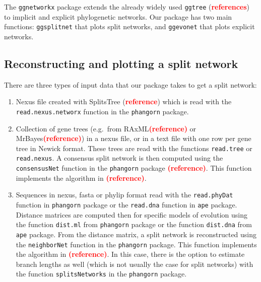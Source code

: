 \documentclass[]{IEEEtran}
\providecommand{\tightlist}{%
  \setlength{\itemsep}{0pt}\setlength{\parskip}{0pt}}
\begin{document}
The \texttt{ggnetworkx} package extends the already widely used \texttt{ggtree} (\textcolor{red}{\textbf{references}}) to implicit and explicit phylogenetic networks. Our package has two main functions: \texttt{ggsplitnet} that plots split networks, and \texttt{ggevonet} that plots explicit networks.

\vspace{-0.25cm}

\hypertarget{reconstructing-and-plotting-a-split-network}{%
\subsection{Reconstructing and plotting a split network}\label{reconstructing-and-plotting-a-split-network}}

There are three types of input data that our package takes to get a split network:

\begin{enumerate}
\def\labelenumi{\arabic{enumi}.}
\tightlist
\item
  Nexus file created with SplitsTree (\textcolor{red}{\textbf{reference}}) which is read with the \texttt{read.nexus.networx} function in the \texttt{phangorn} package.
\item
  Collection of gene trees (e.g.~from RAxML\textcolor{red}{\textbf{(reference)}} or MrBayes\textcolor{red}{\textbf{(reference)}}) in a nexus file, or in a text file with one row per gene tree in Newick format. These trees are read with the functions \texttt{read.tree} or \texttt{read.nexus}. A consensus split network is then computed using the \texttt{consensusNet} function in the \texttt{phangorn} package \textcolor{red}{\textbf{(reference)}}. This function implements the algorithm in \textcolor{red}{\textbf{(reference)}}.
\item
  Sequences in nexus, fasta or phylip format read with the \texttt{read.phyDat} function in \texttt{phangorn} package or the \texttt{read.dna} function in \texttt{ape} package. Distance matrices are computed then for specific models of evolution using the function \texttt{dist.ml} from \texttt{phangorn} package or the function \texttt{dist.dna} from \texttt{ape} package. From the distance matrix, a split network is reconstructed using the \texttt{neighborNet} function in the \texttt{phangorn} package. This function implements the algorithm in \textcolor{red}{\textbf{(reference)}}. In this case, there is the option to estimate branch lengths as well (which is not usually the case for split networks) with the function \texttt{splitsNetworks} in the \texttt{phangorn} package.
\end{enumerate}
\end{document}
